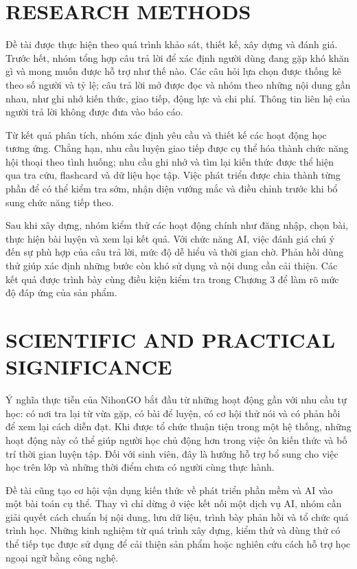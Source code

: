 \section{RESEARCH METHODS}

Đề tài được thực hiện theo quá trình khảo sát, thiết kế, xây dựng và đánh giá. Trước hết, nhóm tổng hợp câu trả lời để xác định người dùng đang gặp khó khăn gì và mong muốn được hỗ trợ như thế nào. Các câu hỏi lựa chọn được thống kê theo số người và tỷ lệ; câu trả lời mở được đọc và nhóm theo những nội dung gần nhau, như ghi nhớ kiến thức, giao tiếp, động lực và chi phí. Thông tin liên hệ của người trả lời không được đưa vào báo cáo.

Từ kết quả phân tích, nhóm xác định yêu cầu và thiết kế các hoạt động học tương ứng. Chẳng hạn, nhu cầu luyện giao tiếp được cụ thể hóa thành chức năng hội thoại theo tình huống; nhu cầu ghi nhớ và tìm lại kiến thức được thể hiện qua tra cứu, flashcard và dữ liệu học tập. Việc phát triển được chia thành từng phần để có thể kiểm tra sớm, nhận diện vướng mắc và điều chỉnh trước khi bổ sung chức năng tiếp theo.

Sau khi xây dựng, nhóm kiểm thử các hoạt động chính như đăng nhập, chọn bài, thực hiện bài luyện và xem lại kết quả. Với chức năng AI, việc đánh giá chú ý đến sự phù hợp của câu trả lời, mức độ dễ hiểu và thời gian chờ. Phản hồi dùng thử giúp xác định những bước còn khó sử dụng và nội dung cần cải thiện. Các kết quả được trình bày cùng điều kiện kiểm tra trong Chương 3 để làm rõ mức độ đáp ứng của sản phẩm.

\section{SCIENTIFIC AND PRACTICAL SIGNIFICANCE}

Ý nghĩa thực tiễn của NihonGO bắt đầu từ những hoạt động gần với nhu cầu tự học: có nơi tra lại từ vừa gặp, có bài để luyện, có cơ hội thử nói và có phản hồi để xem lại cách diễn đạt. Khi được tổ chức thuận tiện trong một hệ thống, những hoạt động này có thể giúp người học chủ động hơn trong việc ôn kiến thức và bố trí thời gian luyện tập. Đối với sinh viên, đây là hướng hỗ trợ bổ sung cho việc học trên lớp và những thời điểm chưa có người cùng thực hành.

Đề tài cũng tạo cơ hội vận dụng kiến thức về phát triển phần mềm và AI vào một bài toán cụ thể. Thay vì chỉ dừng ở việc kết nối một dịch vụ AI, nhóm cần giải quyết cách chuẩn bị nội dung, lưu dữ liệu, trình bày phản hồi và tổ chức quá trình học. Những kinh nghiệm từ quá trình xây dựng, kiểm thử và dùng thử có thể tiếp tục được sử dụng để cải thiện sản phẩm hoặc nghiên cứu cách hỗ trợ học ngoại ngữ bằng công nghệ.

